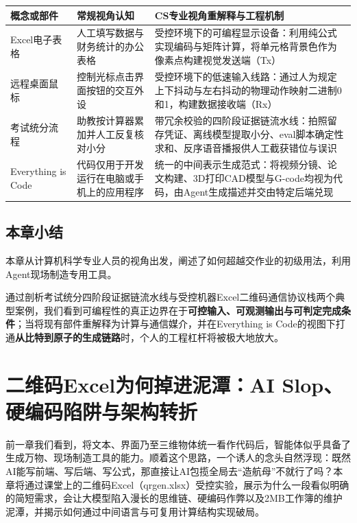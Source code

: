 \documentclass[UTF8,a4paper,11pt,fontset=fandol]{ctexart}
\begin{document}
\begin{center}\small\begin{tabularx}{\linewidth}{YYY}

\toprule

概念或部件 & 常规视角认知 & CS专业视角重解释与工程机制\\\midrule

Excel电子表格 & 人工填写数据与财务统计的办公表格 & 受控环境下的可编程显示设备：利用纯公式实现编码与矩阵计算，将单元格背景色作为像素点构建视觉发送端（Tx）\\[3pt]

远程桌面鼠标 & 控制光标点击界面按钮的交互外设 & 受控环境下的低速输入线路：通过人为规定上下抖动与左右抖动的物理动作映射二进制0和1，构建数据接收端（Rx）\\[3pt]

考试统分流程 & 助教按计算器累加并人工反复核对小分 & 带冗余校验的四阶段证据链流水线：拍照留存凭证、离线模型提取小分、eval脚本确定性求和、反序语音播报供人工截获错位与误识\\[3pt]

Everything is Code & 代码仅用于开发运行在电脑或手机上的应用程序 & 统一的中间表示生成范式：将视频分镜、论文构建、3D打印CAD模型与G-code均视为代码，由Agent生成描述并交由特定后端兑现\\[3pt]

\bottomrule\end{tabularx}\end{center}

\subsection{本章小结}

本章从计算机科学专业人员的视角出发，阐述了如何超越交作业的初级用法，利用Agent现场制造专用工具。

通过剖析考试统分四阶段证据链流水线与受控机器Excel二维码通信协议栈两个典型案例，我们看到可编程性的真正边界在于\textbf{可控输入、可观测输出与可判定完成条件}；当将现有部件重解释为计算与通信媒介，并在Everything is Code的视图下打通\textbf{从比特到原子的生成链路}时，个人的工程杠杆将被极大地放大。

\section{二维码Excel为何掉进泥潭：AI Slop、硬编码陷阱与架构转折}

前一章我们看到，将文本、界面乃至三维物体统一看作代码后，智能体似乎具备了生成万物、现场制造工具的能力。顺着这个思路，一个诱人的念头自然浮现：既然AI能写前端、写后端、写公式，那直接让AI包揽全局去“造航母”不就行了吗？本章将通过课堂上的二维码Excel（qrgen.xlsx）受控实验，展示为什么一段看似明确的简短需求，会让大模型陷入漫长的思维链、硬编码作弊以及2MB工作簿的维护泥潭，并揭示如何通过中间语言与可复用计算结构实现破局。
\end{document}
